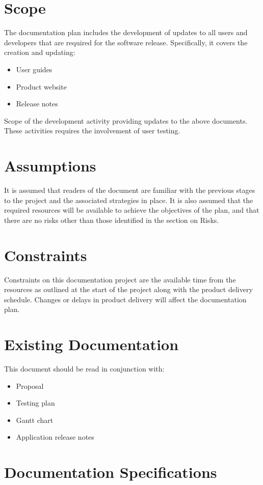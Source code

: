 \documentclass[12pt]{article}
\begin{document}
\section{Scope}
The documentation plan includes the development of updates to all users and developers that are required for the software release. Specifically, it covers the creation and updating:
\begin{itemize}
	\item User guides
    \item Product website
	\item Release notes
\end{itemize}

Scope of the development activity providing updates to the above documents. These activities requires the involvement of user testing. 

\section{Assumptions}
It is assumed that readers of the document are familiar with the previous stages to the project and the associated strategies in place. It is also assumed that the required resources will be available to achieve the objectives of the plan, and that there are no risks other than those identified in the section on Risks.

\section{Constraints}
Constraints on this documentation project are the available time from the resources as outlined at the start of the project along with the product delivery schedule. Changes or delays in product delivery will affect the documentation plan.

\section{Existing Documentation}
This document should be read in conjunction with:
\begin{itemize}
    \item Proposal
    \item Testing plan
    \item Gantt chart
    \item Application release notes
\end{itemize}

\section{Documentation Specifications}
\end{document}
